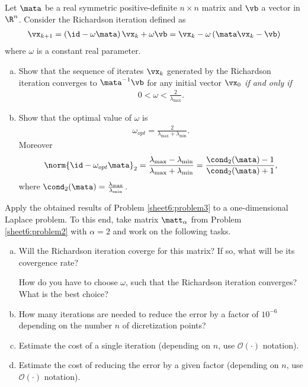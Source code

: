 \begin{Sheet}
  \begin{Problem}
    \label{sheet6:problem3}
    Let $\mata$ be a real symmetric positive-definite $n\times n$
    matrix and $\vb$ a vector in $\R^n$. Consider the Richardson
    iteration defined as
    \begin{gather*}
      \vx_{k+1}
      = \left(\id-\omega\mata \right)\vx_k + \omega\vb
      = \vx_k - \omega\left(\mata\vx_k - \vb \right)
    \end{gather*}
    where $\omega$ is a constant real parameter.
    \begin{enumerate}[(a)]
    \item Show that the sequence of iterates $\vx_k$ generated by the
      Richardson iteration converges to $\mata^{-1}\vb$ for any
      initial vector $\vx_0$ \textit{if and only if}
      \begin{gather*}
        0 < \omega < \frac{2}{\lambda_{\max}}.
      \end{gather*}
    \item Show that the optimal value of $\omega$ is
      \begin{gather*}
        \omega_{opt} = \frac2{\lambda_{\max} + \lambda_{\min}}.
      \end{gather*}
      Moreover
      \begin{gather*}
        \norm{\id-\omega_{opt}\mata}_2
        = \frac{\lambda_{\max} - \lambda_{\min}}{\lambda_{\max} + \lambda_{\min}}
        = \frac{\cond_2(\mata)-1}{\cond_2(\mata)+1},
      \end{gather*}
      where $\cond_2(\mata) = \frac{\lambda_{\max}}{\lambda_{\min}}$.
    \end{enumerate}
  \end{Problem}

  \begin{Problem}
    Apply the obtained results of Problem \ref{sheet6:problem3} to a
    one-dimensional Laplace problem. To this end, take matrix
    $\matt_{\alpha}$ from Problem \ref{sheet6:problem2} with
    $\alpha = 2$ and work on the following tasks.
    \begin{enumerate}[(a)]
    \item Will the Richardson iteration coverge for this matrix? If
      so, what will be its covergence rate?
      \begin{todo}
        How do you have to choose $\omega$, such that the Richardson
        iteration converges? What is the best choice?
      \end{todo}
    \item How many iterations are needed to reduce the error by a
      factor of $10^{-6}$ depending on the number $n$ of dicretization
      points?
    \item Estimate the cost of a single iteration (depending on $n$,
      use $\mathcal{O}(\cdot)$ notation).
    \item Estimate the cost of reducing the error by a given factor
      (depending on $n$, use $\mathcal{O}(\cdot)$ notation).
    \end{enumerate}
  \end{Problem}

\end{Sheet}


